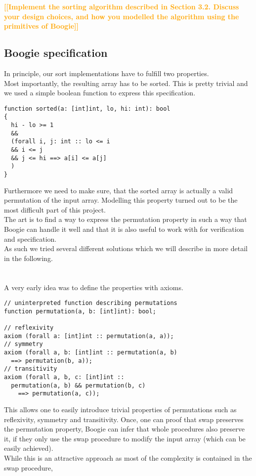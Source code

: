 \documentclass{report}
\newcommand{\todo}[1]{\textsf{\textbf{\textcolor{orange}{[[#1]]}}}}
\begin{document}
\todo{Implement the sorting algorithm described in
Section 3.2. Discuss your design choices, and how you modelled the algorithm using the
primitives of Boogie}

\subsection{Boogie specification}
In principle, our sort implementations have to fulfill two properties.\\
Most importantly, the resulting array has to be sorted. This is pretty trivial and we used
a simple boolean function to express this specification.
\begin{lstlisting}
function sorted(a: [int]int, lo, hi: int): bool
{
  hi - lo >= 1
  &&
  (forall i, j: int :: lo <= i 
  && i <= j 
  && j <= hi ==> a[i] <= a[j]
  )
}
\end{lstlisting}
Furthermore we need to make sure, that the sorted array is actually a valid
permutation of the input array. Modelling this property turned out to be the most difficult part
of this project.\\
The art is to find a way to express the permutation property in such a way that
Boogie can handle it well and that it is also useful to work with for verification
and specification.\\
As such we tried several different solutions which we will describe in more detail
in the following.\\
\\
\\
A very early idea was to define the properties with axioms.
\begin{lstlisting}
// uninterpreted function describing permutations
function permutation(a, b: [int]int): bool;

// reflexivity
axiom (forall a: [int]int :: permutation(a, a));
// symmetry
axiom (forall a, b: [int]int :: permutation(a, b)
  ==> permutation(b, a));
// transitivity
axiom (forall a, b, c: [int]int ::
  permutation(a, b) && permutation(b, c)
    ==> permutation(a, c));
\end{lstlisting}
This allows one to easily introduce trivial properties of permutations such as
reflexivity, symmetry and transitivity. Once, one can proof that swap preserves
the permutation property, Boogie can infer that whole procedures also preserve
it, if they only use the swap procedure to modify the input array (which can be easily achieved).\\
While this is an attractive approach as most of the complexity is contained in the swap procedure,
\end{document}
